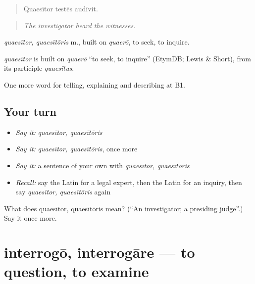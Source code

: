 \begin{quote}
Quaesītor testēs audīvit.
\end{quote}

\begin{quote}
\emph{The investigator heard the witnesses.}
\end{quote}

\emph{quaesītor, quaesītōris} m., built on \emph{quaerō}, to seek, to inquire.

\begin{cousinweb}
\emph{quaesītor} is built on \emph{quaerō} \textquotedblleft{}to seek, to inquire\textquotedblright{} (EtymDB; Lewis \& Short), from its participle \emph{quaesītus}.
\end{cousinweb}

\begin{grammarlens}[title={What you've built}]
One more word for telling, explaining and describing at B1.
\end{grammarlens}

\subsection*{Your turn}
\begin{itemize}
\raggedright
  \item \emph{Say it:} \emph{quaesītor, quaesītōris}
  \item \emph{Say it:} \emph{quaesītor, quaesītōris}, once more
  \item \emph{Say it:} a sentence of your own with \emph{quaesītor, quaesītōris}
  \item \emph{Recall:} say the Latin for a legal expert, then the Latin for an inquiry, then say \emph{quaesītor, quaesītōris} again
\end{itemize}

\begin{tcolorbox}[breakable,colback=teal!4,colframe=teal!35!black,title={Before you move on}]
What does quaesītor, quaesītōris mean? (\textquotedblleft{}An investigator; a presiding judge\textquotedblright{}.) Say it once more.
\end{tcolorbox}
\section[interrogō, interrogāre]{interrogō, interrogāre — to question, to examine}

\label{lesson:LA-C412-interrogo}



